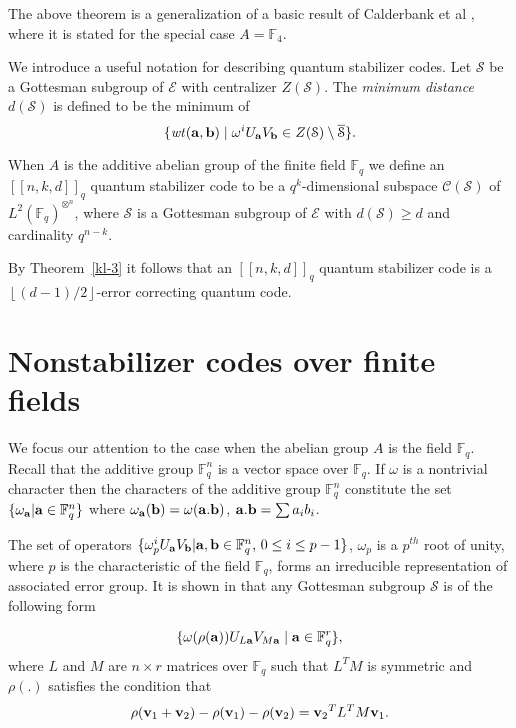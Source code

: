 \documentclass{Rinton-P9x6}
\newcommand{\floor}[1]{\ensuremath{\left\lfloor{#1}\right\rfloor}}
\newcommand{\F}{\ensuremath{\mathbb{F}}}
\newcommand{\GF}[2][]{{\ensuremath{\mathbb{F}_{#2}^{#1}}}}
\renewcommand{\a}{{\bf a}}
\renewcommand{\b}{{\bf b}}
\renewcommand{\v}{{\bf v}}
\newcommand{\om}{{\omega}}
\newcommand{\brac}[2]{{\ensuremath{[[{#1}]]_{{#2}}}}}
\newcommand{\wt}{{\it wt}}
\newcommand{\C}{{\ensuremath{\mathcal{C}}}}
\renewcommand{\S}{{\ensuremath{\mathcal{S}}}}
\newcommand{\cS}{{\ensuremath{\overline{\mathcal{S}}}}}
\newcommand{\E}{{\ensuremath{\mathcal{E}}}}
\begin{document}
The above theorem is a generalization of a basic result of Calderbank et al 
\cite[Theorem 1]{cald-shor}, where it is stated for the special case $A=\F_4$.

We introduce a useful notation for describing quantum stabilizer
codes. Let $\S$ be a Gottesman subgroup of $\E$ with centralizer
$Z(\S)$. The \emph{minimum distance} $d(\S)$ is defined to be the
minimum of
\[
\{\wt(\a,\b)\mid \om^iU_{\a}V_{\b}\in Z(\S)\setminus\cS\}.
\]

When $A$ is the additive abelian group of the finite field $\F_q$ we
define an $\brac{n,k,d}{q}$ quantum stabilizer code to be a
$q^k$-dimensional subspace $\C(\S)$ of $L^2(\F_q)^{\otimes^n}$, where
$\S$ is a Gottesman subgroup of $\E$ with $d(\S)\geq d$ and cardinality
$q^{n-k}$.

By Theorem~\ref{kl-3} it follows that an $\brac{n,k,d}{q}$ quantum
stabilizer code is a $\floor{(d-1)/2}$-error correcting quantum code.

\section{Nonstabilizer codes over finite fields}\label{finitefieldsection}

We focus our attention to the case when the abelian group $A$ is the
field $ \GF{q}$. Recall that the additive group $\GF[n]{q}$ is a
vector space over $\mathbb{F}_q$. If $\omega$ is a nontrivial
character then the characters of the additive group $\GF[n]{q}$
constitute the set $\{ \omega_{\bf a} | {\bf a} \in \GF[n]{q} \}$
where $\omega_{\bf a}({\bf b}) = \omega( {\bf a} . {\bf b})$, $\a . \b
= \sum a_i b_i$.

The set of operators $\{ \omega_p^i U_{\bf a} V_{\bf b} | {\bf a},{\bf
  b} \in \GF[n]{q}\textrm{, } 0 \leq i \leq p-1 \}$, $\omega_p$ is a
$p^{th}$ root of unity, where $p$ is the characteristic of the field
$\GF{q}$, forms an irreducible representation of associated error
group.  It is shown in\cite{AP02} that any Gottesman subgroup $\S$ is
of the following form

\begin{eqnarray*}\label{eq-lm}
\{ \omega(\rho({\a}))U_{L{\a}}V_{M{\a}}\mid {\bf a}\in\GF[r]{q}\},
\end{eqnarray*}
where $L$ and $M$ are $n \times r$ matrices over $\GF{q}$ such that $L^{T}M$ is
symmetric and $\rho(.)$ satisfies the condition that
\[
\rho({\v_1} + {\v_2}) - \rho({\v_1}) - \rho({\v_2}) = {\v_2}^{T}L^{T} M{\v_1}.
\]
\end{document}
